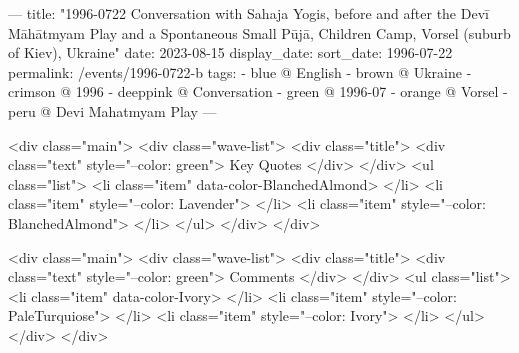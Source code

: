---
title: "1996-0722 Conversation with Sahaja Yogis, before and after the Devī Māhātmyam Play and a Spontaneous Small Pūjā, Children Camp, Vorsel (suburb of Kiev), Ukraine"
date: 2023-08-15
display_date: 
sort_date: 1996-07-22
permalink: /events/1996-0722-b
tags:
  - blue @ English
  - brown @ Ukraine
  - crimson @ 1996
  - deeppink @ Conversation 
  - green @ 1996-07
  - orange @ Vorsel
  - peru @ Devi Mahatmyam Play
---

<div class="main">
  <div class="wave-list">
    <div class="title">
      <div class="text" style="--color: green">
        Key Quotes
      </div>
    </div>
    <ul class="list">
        <li class="item" data-color-BlanchedAlmond>
        </li>
        <li class="item" style="--color: Lavender">
        </li>
        <li class="item" style="--color: BlanchedAlmond">
        </li>
      </ul>
  </div>
</div>

<div class="main">
  <div class="wave-list">
    <div class="title">
      <div class="text" style="--color: green">
        Comments
      </div>
    </div>
    <ul class="list">
        <li class="item" data-color-Ivory>
        </li>
        <li class="item" style="--color: PaleTurquiose">
        </li>
        <li class="item" style="--color: Ivory">
        </li>
      </ul>
  </div>
</div>